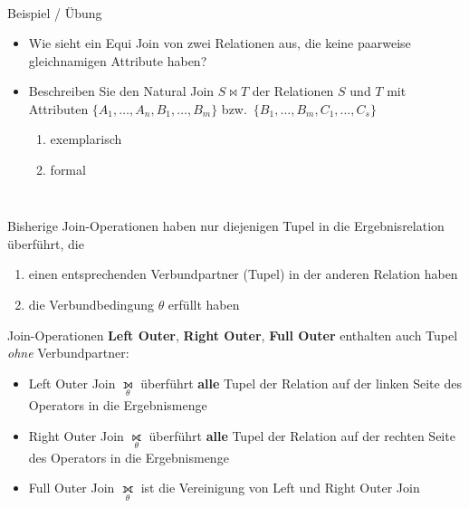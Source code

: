 \begin{frame}\frametitle{\insertsection}
\framesubtitle{\insertsubsection}
\\[8pt]
\begin{alertblock}{Beispiel / \"Ubung}
	\begin{itemize}
		\item Wie sieht ein Equi Join von zwei Relationen aus, die keine paarweise gleichnamigen Attribute haben?\\[6pt]
		\item Beschreiben Sie den Natural Join $S \Join T$ der Relationen $S$ und $T$ mit Attributen $\{A_1,\ldots,A_n,B_1,\ldots, B_m\}$ 
		bzw.~$\{B_1,\ldots, B_m, C_1,\ldots, C_s\}$
		\begin{enumerate}
			\item {\normalsize exemplarisch}\\[4pt]
			\item {\normalsize formal}
		\end{enumerate} 
	\end{itemize}
\end{alertblock}
\end{frame}

\begin{frame}
\frametitle{\insertsection}
\framesubtitle{\insertsubsection}
\onslide
{}\\[8pt]
Bisherige Join-Operationen haben nur diejenigen Tupel in die Ergebnisrelation \"uberf\"uhrt, die
\begin{enumerate}
	\item einen entsprechenden Verbundpartner (Tupel) in der anderen Relation haben
	\item die Verbundbedingung $\theta$ erf\"ullt haben
\end{enumerate}
\abs
\pause
Join-Operationen \textbf{Left Outer}, \textbf{Right Outer}, \textbf{Full Outer} enthalten auch Tupel 
\emph{ohne} Verbundpartner:
\begin{itemize}
	\item Left Outer Join $\underset{\theta}\leftouterjoin$ überf\"uhrt \textbf{alle} Tupel der Relation auf der linken Seite des 
	Operators in die Ergebnismenge 
	\item Right Outer Join $\underset{\theta}\rightouterjoin$ überf\"uhrt \textbf{alle} Tupel der Relation auf der rechten Seite 
	des Operators in die Ergebnismenge 
	\item Full Outer Join $\underset{\theta}\fullouterjoin$ ist die Vereinigung von Left und Right Outer Join
\end{itemize}
\end{frame}

